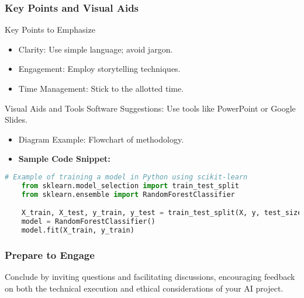 \documentclass[aspectratio=169]{beamer}
\begin{document}
\begin{frame}[fragile]
  \frametitle{Key Points and Visual Aids}
  \begin{block}{Key Points to Emphasize}
      \begin{itemize}
        \item Clarity: Use simple language; avoid jargon.
        \item Engagement: Employ storytelling techniques.
        \item Time Management: Stick to the allotted time.
      \end{itemize}
  \end{block}
  
  \begin{block}{Visual Aids and Tools}
    Software Suggestions: Use tools like PowerPoint or Google Slides.
    \begin{itemize}
        \item Diagram Example: Flowchart of methodology.
        \item \textbf{Sample Code Snippet:}
    \end{itemize}
    
    \begin{lstlisting}[language=Python]
    # Example of training a model in Python using scikit-learn
    from sklearn.model_selection import train_test_split
    from sklearn.ensemble import RandomForestClassifier

    X_train, X_test, y_train, y_test = train_test_split(X, y, test_size=0.2)
    model = RandomForestClassifier()
    model.fit(X_train, y_train)
    \end{lstlisting}
  \end{block}
\end{frame}

\begin{frame}
  \frametitle{Prepare to Engage}
  Conclude by inviting questions and facilitating discussions, encouraging feedback on both the technical execution and ethical considerations of your AI project. 
\end{frame}
\end{document}
